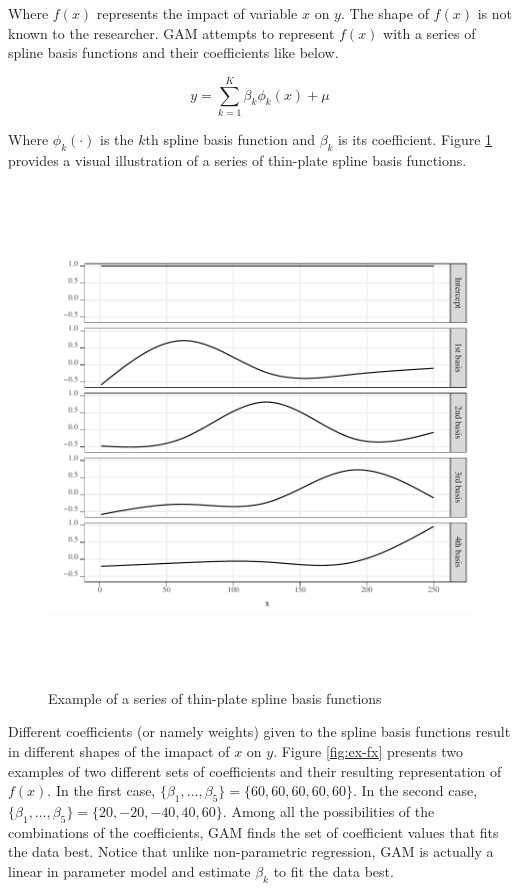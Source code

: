 \documentclass[
]{article}
\begin{document}
Where \(f(x)\) represents the impact of variable \(x\) on \(y\). The shape of \(f(x)\) is not known to the researcher. GAM attempts to represent \(f(x)\) with a series of spline basis functions and their coefficients like below.

\begin{equation}
y = \sum_{k=1}^K \beta_k \phi_k(x) + \mu
\end{equation}

Where \(\phi_k(\cdot)\) is the \(k\)th spline basis function and \(\beta_k\) is its coefficient. Figure \ref{fig:sp-basis} provides a visual illustration of a series of thin-plate spline basis functions.

\begin{figure}[H]

{\centering \includegraphics[width=6in,height=500px,]{Figures/g_basis} 

}

\caption{Example of a series of thin-plate spline basis functions}\label{fig:sp-basis}
\end{figure}

Different coefficients (or namely weights) given to the spline basis functions result in different shapes of the imapact of \(x\) on \(y\). Figure \ref{fig:ex-fx} presents two examples of two different sets of coefficients and their resulting representation of \(f(x)\). In the first case, \(\{\beta_1, \dots, \beta_5\} = \{60, 60, 60, 60, 60\}\). In the second case, \(\{\beta_1, \dots, \beta_5\} = \{20, -20, -40, 40, 60\}\). Among all the possibilities of the combinations of the coefficients, GAM finds the set of coefficient values that fits the data best. Notice that unlike non-parametric regression, GAM is actually a linear in parameter model and estimate \(\beta_k\) to fit the data best.
\end{document}
